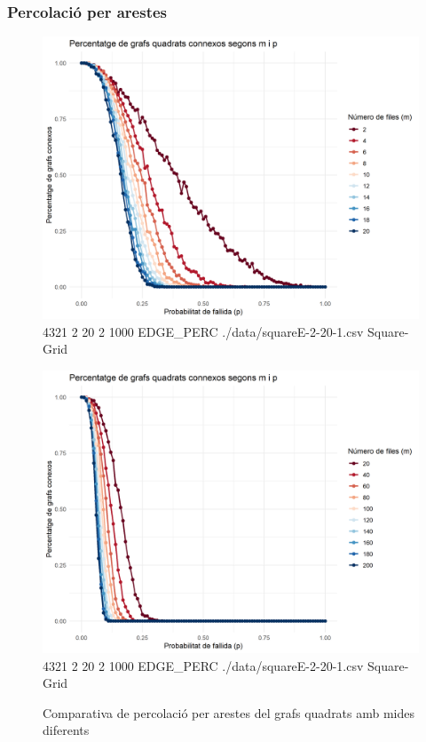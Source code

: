 \documentclass[a4paper]{article}
\begin{document}
	\subsubsection{Percolació per arestes}
	
	\begin{figure}[h]
		\centering
		\begin{minipage}{0.45\textwidth}
			\centering
			\includegraphics[width=\textwidth]{images/squareE-2-20-1}
			\footnotesize{4321 2 20 2 1000 EDGE\_PERC ./data/squareE-2-20-1.csv Square-Grid}
		\end{minipage}
		\hfill
		\begin{minipage}{0.45\textwidth}
			\centering
			\includegraphics[width=\textwidth]{images/squareE-20-200}
			\footnotesize{4321 2 20 2 1000 EDGE\_PERC ./data/squareE-2-20-1.csv Square-Grid}
		\end{minipage}
		\caption{Comparativa de percolació per arestes del grafs quadrats amb mides diferents}
		\label{fig:percolation_edges_square}
	\end{figure}
	
\end{document}
